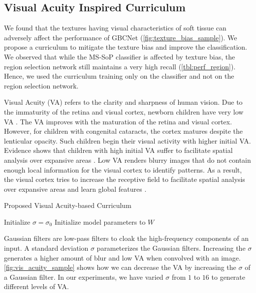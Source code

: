 \subsection{Visual Acuity Inspired Curriculum}
%
We found that the textures having visual characteristics of soft tissue can adversely affect the performance of GBCNet (\cref{fig:texture_bias_sample}). We propose a curriculum to mitigate the texture bias and improve the classification. We observed that while the MS-SoP classifier is affected by texture bias, the region selection network still maintains a very high recall (\cref{tbl:perf_region}). Hence, we used the curriculum training only on the classifier and not on the region selection network.

%
Visual Acuity (VA) refers to the clarity and sharpness of human vision. Due to the immaturity of the retina and visual cortex, newborn children have very low VA \cite{courage1990visual}. The VA improves with the maturation of the retina and visual cortex. However, for children with congenital cataracts, the cortex matures despite the lenticular opacity. Such children begin their visual activity with higher initial VA. Evidence shows that children with high initial VA suffer to facilitate spatial analysis over expansive areas \cite{vogelsang2018VisualAcuity}.  Low VA renders blurry images that do not contain enough local information for the visual cortex to identify patterns. As a result, the visual cortex tries to increase the receptive field to facilitate spatial analysis over expansive areas and learn global features \cite{kwon2016compensation, smith2009smile}. 

\begin{algorithm}[t]
\small  
	\caption{Proposed Visual Acuity-based Curriculum}
	\label{va_algo}
	\SetAlgoLined
	Initialize $\sigma = \sigma_0$ \;
	Initialize model parameters to $W$ \;
	
\end{algorithm}


%
Gaussian filters are low-pass filters to cloak the high-frequency components of an input. A standard deviation $\sigma$ parameterizes the Gaussian filters. Increasing the $\sigma$ generates a higher amount of blur and low VA when convolved with an image. \cref{fig:vis_acuity_sample} shows how we can decrease the VA by increasing the $\sigma$ of a Gaussian filter. In our experiments, we have varied $\sigma$ from $1$ to $16$ to generate different levels of VA. 

